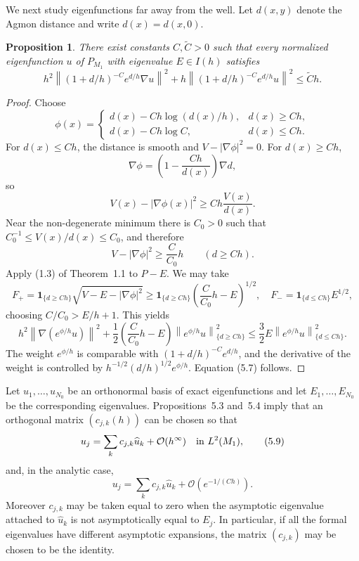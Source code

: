 \documentclass[11pt,a4paper]{article}
\newcommand{\cO}{\mathcal O}
\newcommand{\norm}[1]{\left\lVert #1\right\rVert}
\numberwithin{equation}{section}
\newtheorem{proposition}[theorem]{Proposition}
\theoremstyle{remark}
\begin{document}
We next study eigenfunctions far away from the well. Let $d(x,y)$ denote the Agmon distance and write $d(x)=d(x,0)$.

\begin{proposition}
There exist constants $C,\widetilde C>0$ such that every normalized eigenfunction $u$ of $P_{M_1}$ with eigenvalue $E\in I(h)$ satisfies
\begin{equation}
 h^2\norm{(1+d/h)^{-C}e^{d/h}\nabla u}^2
 +h\norm{(1+d/h)^{-C}e^{d/h}u}^2
 \le \widetilde C h.
\tag{5.7}
\end{equation}
\end{proposition}
\begin{proof}
Choose
\[
\phi(x)=
\begin{cases}
 d(x)-Ch\log(d(x)/h),&d(x)\ge Ch,\\
 d(x)-Ch\log C,&d(x)\le Ch.
\end{cases}
\]
For $d(x)\le Ch$, the distance is smooth and $V-|\nabla\phi|^2=0$. For $d(x)\ge Ch$,
\[
\nabla\phi=\left(1-\frac{Ch}{d(x)}\right)\nabla d,
\]
so
\[
V(x)-|\nabla\phi(x)|^2\ge C h\frac{V(x)}{d(x)}.
\]
Near the non-degenerate minimum there is $C_0>0$ such that
$C_0^{-1}\le V(x)/d(x)\le C_0$, and therefore
\[
V-|\nabla\phi|^2\ge \frac{C}{C_0}h
\qquad(d\ge Ch).
\]
Apply (1.3) of Theorem~1.1 to $P-E$. We may take
\[
F_+=\mathbf1_{\{d\ge Ch\}}
 \sqrt{V-E-|\nabla\phi|^2}
\ge \mathbf1_{\{d\ge Ch\}}
 \left(\frac{C}{C_0}h-E\right)^{1/2},
\quad
F_-=\mathbf1_{\{d\le Ch\}}E^{1/2},
\]
choosing $C/C_0>E/h+1$. This yields
\begin{equation}
 h^2\norm{\nabla(e^{\phi/h}u)}^2
 +\frac12\left(\frac{C}{C_0}h-E\right)
 \norm{e^{\phi/h}u}_{\{d\ge Ch\}}^2
 \le \frac32 E\norm{e^{\phi/h}u}_{\{d\le Ch\}}^2.
\tag{5.8}
\end{equation}
The weight $e^{\phi/h}$ is comparable with $(1+d/h)^{-C}e^{d/h}$, and the derivative of the weight is controlled by $h^{-1/2}(d/h)^{1/2}e^{\phi/h}$. Equation (5.7) follows.
\end{proof}

Let $u_1,\ldots,u_{N_0}$ be an orthonormal basis of exact eigenfunctions and let $E_1,\ldots,E_{N_0}$ be the corresponding eigenvalues. Propositions~5.3 and~5.4 imply that an orthogonal matrix $(c_{j,k}(h))$ can be chosen so that
\begin{equation}
u_j=\sum_k c_{j,k}\widehat u_k+\cO(h^\infty)
\quad\hbox{in }L^2(M_1),
\tag{5.9}
\end{equation}
and, in the analytic case,
\begin{equation}
u_j=\sum_k c_{j,k}\widehat u_k+\cO(e^{-1/(Ch)}).
\tag{5.10}
\end{equation}
Moreover $c_{j,k}$ may be taken equal to zero when the asymptotic eigenvalue attached to $\widehat u_k$ is not asymptotically equal to $E_j$. In particular, if all the formal eigenvalues have different asymptotic expansions, the matrix $(c_{j,k})$ may be chosen to be the identity.
\end{document}
